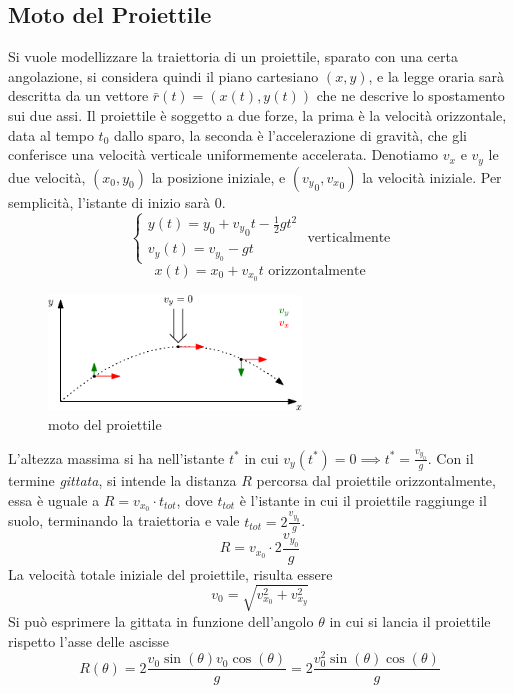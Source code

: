 \documentclass[10pt, letterpaper]{report}
\begin{document}
\subsection{Moto del Proiettile}
Si vuole modellizzare la traiettoria di un proiettile, sparato con una certa angolazione, si 
considera quindi il piano cartesiano $(x,y)$, e la legge oraria sarà descritta da un 
vettore $\bar r(t)=(x(t),y(t))$ che ne descrive lo spostamento sui due assi.\acc 
Il proiettile è soggetto a due forze, la prima è la velocità orizzontale, data al tempo 
$t_0$ dallo sparo, la seconda è l'accelerazione di gravità, che gli conferisce una velocità 
verticale uniformemente accelerata. Denotiamo $v_x$ e $v_y$ le due velocità, $(x_0,y_0)$ la 
posizione iniziale, e $({v_y}_0,{v_x}_0)$ la velocità iniziale. Per semplicità, l'istante di inizio 
sarà $0$.
$$\begin{cases}
    y(t)=y_0+{v_y}_0t-\frac{1}{2}gt^2\\ 
    v_y(t)=v_{y_0}-gt
\end{cases} \text{ verticalmente}$$
$$ x(t)=x_0+v_{x_0}t\text{ orizzontalmente}$$
\begin{center}
    \begin{figure}[h!]
        \centering
        \includegraphics[width=0.6\textwidth]{images/motoProiettile.eps}
        \caption{moto del proiettile}
        \label{fig:pro}
    \end{figure} 
\end{center}
L'altezza massima si ha nell'istante $t^*$ in cui $v_y(t^*)=0\implies t^*=\frac{v_{y_0}}{g}$.
Con il termine \textit{gittata}, si intende la distanza $R$ percorsa dal proiettile orizzontalmente, 
essa è uguale a $R=v_{x_0}\cdot t_{tot}$, dove $t_{tot}$ è l'istante in cui il proiettile raggiunge 
il suolo, terminando la traiettoria e vale $t_{tot}=2\frac{v_{y_0}}{g}$.
$$ R=v_{x_0}\cdot2\frac{v_{y_0}}{g}$$ La velocità totale iniziale del proiettile, risulta 
essere 
$$ v_0=\sqrt{v_{x_0}^2+v_{x_y}^2}$$
Si può esprimere la gittata in funzione dell'angolo $\theta$ in cui si lancia il proiettile rispetto 
l'asse delle ascisse 
$$ R(\theta)=2\frac{v_0\sin(\theta)v_0\cos(\theta)}{g}=2\frac{v_0^2\sin(\theta)\cos(\theta)}{g}$$
\end{document}
